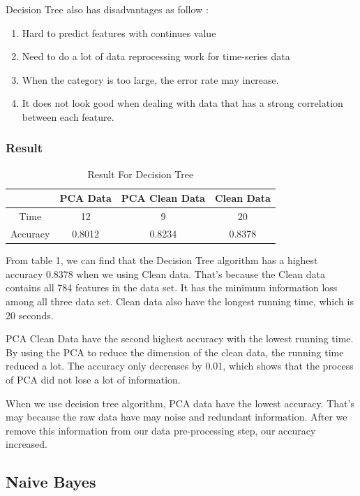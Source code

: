 \documentclass[sigconf]{acmart}
\begin{document}
Decision Tree also has disadvantages as follow \cite{DT}:
\begin{enumerate}
    \item Hard to predict features with continues value
    \item Need to do a lot of data reprocessing work for time-series data
    \item When the category is too large, the error rate may increase.
    \item It does not look good when dealing with data that has a strong correlation between each feature.
\end{enumerate}

\subsubsection{Result}

\begin{table}[htb]
    \centering
    \begin{tabular}{|c|c|c|c|} \hline
                 &  PCA Data & PCA Clean Data & Clean Data \\ \hline
        Time     &  12       & 9              & 20         \\
        Accuracy &  0.8012   & 0.8234         & 0.8378     \\ \hline
    \end{tabular}
    \caption{Result For Decision Tree}
\end{table}

From table 1, we can find that the Decision Tree algorithm has a highest accuracy 0.8378 when we using Clean data. That's because the Clean data contains all 784 features in the data set. It has the minimum information loss among all three data set. Clean data also have the longest running time, which is 20 seconds. 

PCA Clean Data have the second highest accuracy with the lowest running time. By using the PCA to reduce the dimension of the clean data, the running time reduced a lot. The accuracy only decreases by 0.01, which shows that the process of PCA did not lose a lot of information. 

When we use decision tree algorithm, PCA data have the lowest accuracy. That's may because the raw data have may noise and redundant information. After we remove this information from our data pre-processing step, our accuracy increased.

\subsection{Naive Bayes}
\end{document}
